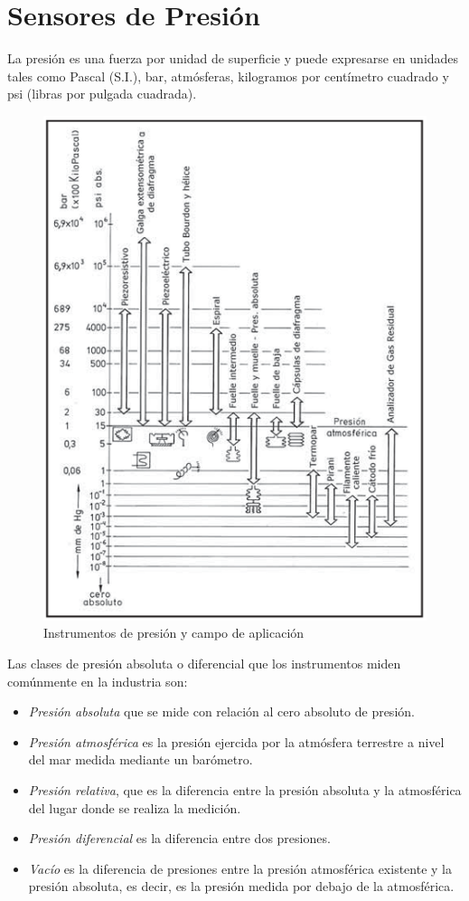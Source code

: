 \chapter{Sensores de Presión}
La presión es una fuerza por unidad de superficie y puede expresarse en unidades tales como Pascal (S.I.), bar, atmósferas, kilogramos por centímetro cuadrado y psi (libras por pulgada cuadrada).

\begin{figure}[H]
    \centering
    \includegraphics[width=0.5\linewidth]{Imagenes/Presion.png}
    \caption{Instrumentos de presión y campo de aplicación}
\end{figure}

Las clases de presión absoluta o diferencial que los instrumentos miden comúnmente en la industria son:
\begin{itemize}
    \item \textit{Presión absoluta} que se mide con relación al cero absoluto de presión.
    \item \textit{Presión atmosférica} es la presión ejercida por la atmósfera terrestre a nivel del mar medida mediante un barómetro.
    \item \textit{Presión relativa}, que es la diferencia entre la presión absoluta y la atmosférica del lugar donde se realiza la medición.
    \item \textit{Presión diferencial} es la diferencia entre dos presiones.
    \item \textit{Vacío} es la diferencia de presiones entre la presión atmosférica existente y la presión absoluta, es decir, es la presión medida por debajo de la atmosférica.
\end{itemize}

